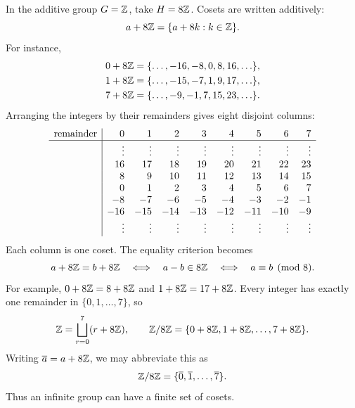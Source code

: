 \documentclass[reqno,11pt]{amsart}
\begin{document}
In the additive group $G=\mathbb{Z}$, take $H=8\mathbb{Z}$. Cosets are written additively:
\begin{equation}
	a+8\mathbb{Z}=\{a+8k:k\in\mathbb{Z}\}.
\end{equation}
For instance,
\begin{align*}
	0+8\mathbb{Z}&=\{\ldots,-16,-8,0,8,16,\ldots\},\\
	1+8\mathbb{Z}&=\{\ldots,-15,-7,1,9,17,\ldots\},\\
	7+8\mathbb{Z}&=\{\ldots,-9,-1,7,15,23,\ldots\}.
\end{align*}
Arranging the integers by their remainders gives eight disjoint columns:
\[
\begin{array}{c|rrrrrrrr}
	\text{remainder}&0&1&2&3&4&5&6&7\\ \hline
	&\vdots&\vdots&\vdots&\vdots&\vdots&\vdots&\vdots&\vdots\\
	&16&17&18&19&20&21&22&23\\
	&8&9&10&11&12&13&14&15\\
	&0&1&2&3&4&5&6&7\\
	&-8&-7&-6&-5&-4&-3&-2&-1\\
	&-16&-15&-14&-13&-12&-11&-10&-9\\
	&\vdots&\vdots&\vdots&\vdots&\vdots&\vdots&\vdots&\vdots
\end{array}
\]
Each column is one coset. The equality criterion becomes
\begin{equation}
	a+8\mathbb{Z}=b+8\mathbb{Z}
	\quad\Longleftrightarrow\quad a-b\in8\mathbb{Z}
	\quad\Longleftrightarrow\quad a\equiv b\pmod8.
\end{equation}
For example, $0+8\mathbb{Z}=8+8\mathbb{Z}$ and $1+8\mathbb{Z}=17+8\mathbb{Z}$.
Every integer has exactly one remainder in $\{0,1,\ldots,7\}$, so
\[
\mathbb{Z}=\bigsqcup_{r=0}^7(r+8\mathbb{Z}),\qquad
\mathbb{Z}/8\mathbb{Z}=\{0+8\mathbb{Z},1+8\mathbb{Z},\ldots,7+8\mathbb{Z}\}.
\]
Writing $\overline a=a+8\mathbb{Z}$, we may abbreviate this as
\[
\mathbb{Z}/8\mathbb{Z}=\{\overline0,\overline1,\ldots,\overline7\}.
\]
Thus an infinite group can have a finite set of cosets.
\end{document}

